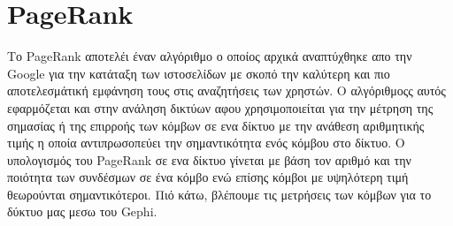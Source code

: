 \documentclass[12pt]{article}
\begin{document}
	
	\newpage
	\section{PageRank}
	Το PageRank αποτελέι έναν αλγόριθμο ο οποίος αρχικά αναπτύχθηκε απο την Google για την κατάταξη των ιστοσελίδων με σκοπό την καλύτερη και πιο αποτελεσμάτική εμφάνηση τους στις αναζητήσεις των χρηστών. Ο αλγόριθμοςς αυτός εφαρμόζεται και στην ανάληση δικτύων  αφου χρησιμοποιείται για την μέτρηση της σημασίας ή της επιρροής των κόμβων σε ενα δίκτυο με την ανάθεση αριθμητικής τιμής η οποία αντιπρωσοπεύει την σημαντικότητα ενός κόμβου στο δίκτυο. Ο υπολογισμός του PageRank σε ενα δίκτυο γίνεται με βάση τον αριθμό και την ποιότητα των συνδέσμων σε ένα κόμβο ενώ επίσης κόμβοι με υψηλότερη τιμή θεωρούνται σημαντικότεροι. Πιό κάτω, βλέπουμε τις μετρήσεις των κόμβων για το δύκτυο μας μεσω του Gephi.
	
\end{document}
